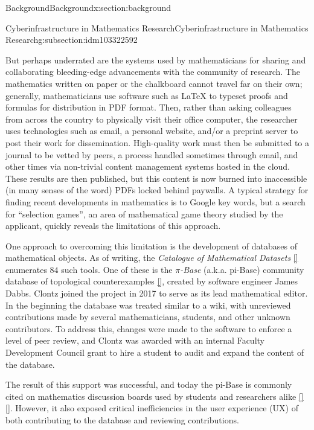 \documentclass[oneside,10pt,]{article}
\newcommand{\xreffont}{\relax}
\newcommand{\pubtitle}[1]{\textsl{#1}}
\begin{document}
\begin{sectionptx}{Background}{}{Background}{}{}{x:section:background}
\begin{subsectionptx}{Cyberinfrastructure in Mathematics Research}{}{Cyberinfrastructure in Mathematics Research}{}{}{g:subsection:idm103322592}
\par
But perhaps underrated are the systems used by mathematicians for sharing and collaborating bleeding-edge advancements with the community of research. The mathematics written on paper or the chalkboard cannot travel far on their own; generally, mathematicians use software such as LaTeX to typeset proofs and formulas for distribution in PDF format. Then, rather than asking colleagues from across the country to physically visit their office computer, the researcher uses technologies such as email, a personal website, and\slash{}or a preprint server to post their work for dissemination. High-quality work must then be submitted to a journal to be vetted by peers, a process handled sometimes through email, and other times via non-trivial content management systems hosted in the cloud. These results are then published, but this content is now burned into inaccessible (in many senses of the word) PDFs locked behind paywalls. A typical strategy for finding recent developments in mathematics is to Google key words, but a search for ``selection games'', an area of mathematical game theory studied by the applicant, quickly reveals the limitations of this approach.%
\par
One approach to overcoming this limitation is the development of databases of mathematical objects. As of writing, the \pubtitle{Catalogue of Mathematical Datasets} \hyperlink{x:biblio:biblio-mathdb}{[{\xreffont 6}]} enumerates \(84\) such tools. One of these is the \pubtitle{\(\pi\)-Base} (a.k.a. pi-Base) community database of topological counterexamples \hyperlink{x:biblio:biblio-pibase}{[{\xreffont 13}]}, created by software engineer James Dabbs. Clontz joined the project in 2017 to serve as its lead mathematical editor. In the beginning the database was treated similar to a wiki, with unreviewed contributions made by several mathematicians, students, and other unknown contributors. To address this, changes were made to the software to enforce a level of peer review, and Clontz was awarded with an internal Faculty Development Council grant to hire a student to audit and expand the content of the database.%
\par
The result of this support was successful, and today the pi-Base is commonly cited on mathematics discussion boards used by students and researchers alike \hyperlink{x:biblio:biblio-mathse-search}{[{\xreffont 28}]} \hyperlink{x:biblio:biblio-mo-search}{[{\xreffont 29}]}. However, it also exposed critical inefficiencies in the user experience (UX) of both contributing to the database and reviewing contributions.%

\end{subsectionptx}
\end{sectionptx}
\end{document}
